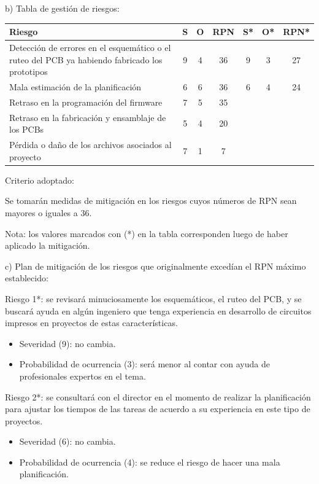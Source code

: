 \documentclass[
11pt, %
codirector, %
]{charter}
\begin{document}
b) Tabla de gestión de riesgos: 

\begin{table}[htpb]
\centering
\begin{tabularx}{\linewidth}{@{}|X|c|c|c|c|c|c|@{}}
\hline
\rowcolor[HTML]{C0C0C0} 
Riesgo & S & O & RPN & S* & O* & RPN* \\ \hline
Detección de errores en el esquemático o el ruteo del PCB ya habiendo fabricado los prototipos&  9&   4&     36&    9&    3&      27\\ \hline
Mala estimación de la planificación      &   6&   6&     36&    6&    4&      24\\ \hline
Retraso en la programación del firmware       &   7&   5&     35&    &    &      \\ \hline
Retraso en la fabricación y ensamblaje de los PCBs       &   5&   4&     20&    &    &      \\ \hline
Pérdida o daño de los archivos asociados al proyecto      &   7&   1&     7&    &    &      \\ \hline
\end{tabularx}%
\end{table}

Criterio adoptado: 

Se tomarán medidas de mitigación en los riesgos cuyos números de RPN sean mayores o iguales a 36.

Nota: los valores marcados con (*) en la tabla corresponden luego de haber aplicado la mitigación.

c) Plan de mitigación de los riesgos que originalmente excedían el RPN máximo establecido:
 
Riesgo 1*: se revisará minuciosamente los esquemáticos, el ruteo del PCB, y se buscará ayuda en algún ingeniero que tenga experiencia en desarrollo de circuitos impresos en proyectos de estas características.
  \begin{itemize}
	\item Severidad (9): no cambia.
	\item Probabilidad de ocurrencia (3): será menor al contar con ayuda de profesionales expertos en el tema.
\end{itemize}

Riesgo 2*: se consultará con el director en el momento de realizar la planificación para ajustar los tiempos de las tareas de acuerdo a su experiencia en este tipo de proyectos.
  \begin{itemize}
	\item Severidad (6): no cambia.
	\item Probabilidad de ocurrencia (4): se reduce el riesgo de hacer una mala planificación.
\end{itemize}
\end{document}
